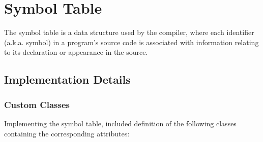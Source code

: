 \documentclass{article}
\begin{document}
\newpage

\section{Symbol Table}
The symbol table is a data structure used by the compiler, where each identifier (a.k.a. symbol) in a program's
source code is associated with information relating to its declaration or appearance in the source.


\subsection{Implementation Details}

\subsubsection{Custom Classes}
Implementing the symbol table, included definition of the following classes containing the corresponding attributes:
\end{document}
